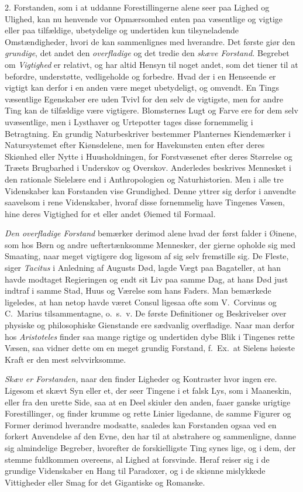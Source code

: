 \documentclass[12pt,a4paper]{article}
\newcommand{\opage}[1]{\marginnote{\footnotesize\textit{[#1]}}}
\begin{document}
2. Forstanden, som i at uddanne Forestillingerne alene seer paa Lighed og Ulighed, kan nu
henvende vor Opmærsomhed enten paa væsentlige og vigtige eller paa tilfældige, ubetydelige
og undertiden kun tilsyneladende Omstændigheder, hvori de kan sammenlignes med hverandre.
Det første giør den \emph{grundige}, det andet den \emph{overfladige} og det tredie den
\emph{skæve Forstand.} Begrebet om \emph{Vigtighed} er relativt, og har altid Hensyn til
noget andet, som det tiener til at befordre, understøtte, vedligeholde og forbedre. Hvad
der i en Henseende er vigtigt kan derfor i en anden være meget ubetydeligt, og omvendt. En
Tings væsentlige Egenskaber ere uden Tvivl for den selv de vigtigste, men for andre Ting
kan de tilfældige være vigtigere. Blomsternes Lugt og Farve ere for dem selv uvæsentlige,
men i Lysthaver og Urtepotter tages disse fornemmelig i Betragtning. En grundig
Naturbeskriver bestemmer Planternes
\opage{151} Kiendemærker i Natursystemet efter Kiønsdelene, men for Havekunsten enten efter deres
Skiønhed eller Nytte i Huusholdningen, for Forstvæsenet efter deres Størrelse og Træets
Brugbarhed i Underskov og Overskov. Anderledes beskrives Mennesket i den rationale
Sielelære end i Anthropologien og Naturhistorien. Men i alle tre Videnskaber kan
Forstanden vise Grundighed. Denne yttrer sig derfor i anvendte saavelsom i rene
Videnskaber, hvoraf disse fornemmelig have Tingenes Væsen, hine deres Vigtighed for et
eller andet Øiemed til Formaal.

\emph{Den overfladige Forstand} bemærker derimod alene hvad der først falder i Øinene, som
hos Børn og andre ueftertænksomme Mennesker, der gierne opholde sig med Smaating, naar
meget vigtigere dog ligesom af sig selv fremstille sig. De Fleste, siger \emph{Tacitus} i
Anledning af Augusts Død, lagde Vægt paa Bagateller, at han havde modtaget Regieringen og
endt sit Liv paa samme Dag, at hans Død just indtraf i samme Stad, Huus og Værelse som
hans Faders. Man bemærkede ligeledes, at han netop havde været Consul ligesaa ofte som
V.~Corvinus og C.~Marius tilsammentagne, o.~s.~v. De første Definitioner og Beskrivelser
over physiske og philosophiske Gienstande ere sædvanlig overfladige. Naar man derfor hos
\emph{Aristoteles} finder saa mange rigtige og undertiden dybe Blik i Tingenes rette
Væsen,
\opage{152} saa vidner dette om en meget grundig Forstand, f.~Ex.\ at Sielens høieste Kraft er den
mest selvvirksomme.

\emph{Skæv er Forstanden,} naar den finder Ligheder og Kontraster hvor ingen ere. Ligesom
et skævt Syn eller et, der seer Tingene i et falsk Lys, som i Maaneskin, eller fra den
urette Side, saa at en Deel skiuler den anden, faaer ganske urigtige Forestillinger, og
finder krumme og rette Linier ligedanne, de samme Figurer og Former derimod hverandre
modsatte, saaledes kan Forstanden ogsaa ved en forkert Anvendelse af den Evne, den har til
at abstrahere og sammenligne, danne sig almindelige Begreber, hvorefter de forskielligste
Ting synes lige, og i dem, der stemme fuldkommen overeens, al Lighed at forsvinde. Heraf
reiser sig i de grundige Videnskaber en Hang til Paradoxer, og i de skiønne mislykkede
Vittigheder eller Smag for det Gigantiske og Romanske.
\end{document}
